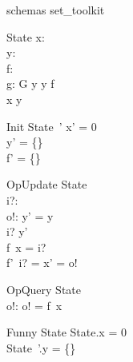 \documentclass{article}
\begin{document}
\begin{zsection}
\SECTION schemas \parents set\_toolkit
\end{zsection}

\begin{zed}
   [G]
\end{zed}

\begin{schema}{State}
   x: \nat \\
   y: \power~\nat \\
   f: \nat \fun \nat \\
   g: G
\where
   y \cross y \subseteq f \\
   x \in y
\end{schema}

\begin{schema}{Init}
   State~'
\where
   x' = 0 \\
   y' = \{\} \\
   f' = \{\}
\end{schema}

\begin{schema}{OpUpdate}
   \Delta State \\
   i?: \nat \\
   o!: \nat
\where
   y' = y \\
   i? \in y' \\
   f~x = i? \\
   f'~i? = x' = o!
\end{schema}

\begin{schema}{OpQuery}
  \Xi State \\
  o!: \nat
\where
   o! = f~x
\end{schema}

\begin{schema}{Funny}
   \Delta State
\where
   \theta State.x = 0 \\
   \theta State~'.y = \{\} 
\end{schema}
\end{document}
